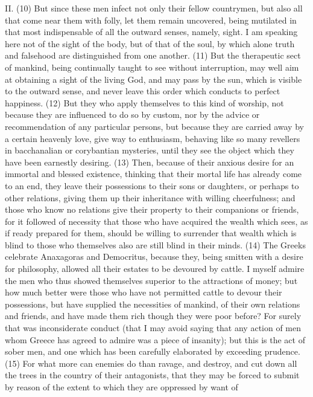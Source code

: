 II. (10) But since these men infect not only their fellow countrymen, but also all that come near them
with folly, let them remain uncovered, being mutilated in that most indispensable of all the outward
senses, namely, sight. I am speaking here not of the sight of the body, but of that of the soul, by
which alone truth and falsehood are distinguished from one another. (11) But the therapeutic sect
of mankind, being continually taught to see without interruption, may well aim at obtaining a sight of
the living God, and may pass by the sun, which is visible to the outward sense, and never leave this
order which conducts to perfect happiness. (12) But they who apply themselves to this kind of
worship, not because they are influenced to do so by custom, nor by the advice or
recommendation of any particular persons, but because they are carried away by a certain
heavenly love, give way to enthusiasm, behaving like so many revellers in bacchanalian or
corybantian mysteries, until they see the object which they have been earnestly desiring. (13)
Then, because of their anxious desire for an immortal and blessed existence, thinking that their
mortal life has already come to an end, they leave their possessions to their sons or daughters, or
perhaps to other relations, giving them up their inheritance with willing cheerfulness; and those who
know no relations give their property to their companions or friends, for it followed of necessity that
those who have acquired the wealth which sees, as if ready prepared for them, should be willing to
surrender that wealth which is blind to those who themselves also are still blind in their minds. (14)
The Greeks celebrate Anaxagoras and Democritus, because they, being smitten with a desire for
philosophy, allowed all their estates to be devoured by cattle. I myself admire the men who thus
showed themselves superior to the attractions of money; but how much better were those who
have not permitted cattle to devour their possessions, but have supplied the necessities of
mankind, of their own relations and friends, and have made them rich though they were poor
before? For surely that was inconsiderate conduct (that I may avoid saying that any action of men
whom Greece has agreed to admire was a piece of insanity); but this is the act of sober men, and
one which has been carefully elaborated by exceeding prudence. (15) For what more can enemies
do than ravage, and destroy, and cut down all the trees in the country of their antagonists, that they
may be forced to submit by reason of the extent to which they are oppressed by want of
